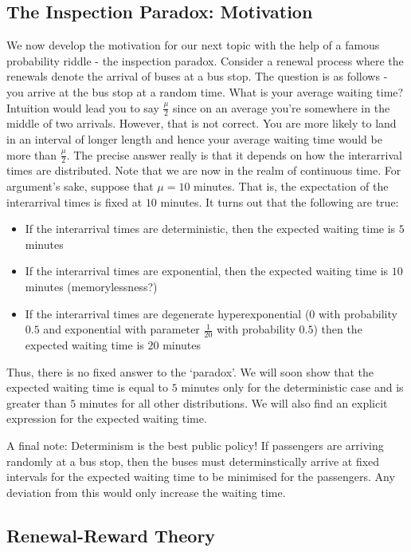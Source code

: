 \documentclass[12pt]{article}
\theoremstyle{definition}
\begin{document}
\subsection{The Inspection Paradox: Motivation}

We now develop the motivation for our next topic with the help of a famous probability riddle - the inspection paradox. Consider a renewal process where the renewals denote the arrival of buses at a bus stop. The question is as follows - you arrive at the bus stop at a random time. What is your average waiting time? Intuition would lead you to say $\frac{\mu}{2}$ since on an average you're somewhere in the middle of two arrivals. However, that is not correct. You are more likely to land in an interval of longer length and hence your average waiting time would be more than $\frac{\mu}{2}$. The precise answer really is that it depends on how the interarrival times are distributed. Note that we are now in the realm of continuous time. For argument's sake, suppose that $\mu = 10$ minutes. That is, the expectation of the interarrival times is fixed at $10$ minutes. It turns out that the following are true:
\begin{itemize}
    \item If the interarrival times are deterministic, then the expected waiting time is $5$ minutes
    \item If the interarrival times are exponential, then the expected waiting time is $10$ minutes (memorylessness?)
    \item If the interarrival times are degenerate hyperexponential ($0$ with probability $0.5$ and exponential with parameter $\frac{1}{20}$ with probability $0.5$) then the expected waiting time is $20$ minutes
\end{itemize}

Thus, there is no fixed answer to the `paradox'. We will soon show that the expected waiting time is equal to $5$ minutes only for the deterministic case and is greater than $5$ minutes for all other distributions. We will also find an explicit expression for the expected waiting time. 

A final note: Determinism is the best public policy! If passengers are arriving randomly at a bus stop, then the buses must determinstically arrive at fixed intervals for the expected waiting time to be minimised for the passengers. Any deviation from this would only increase the waiting time. 

\subsection{Renewal-Reward Theory}
\end{document}
